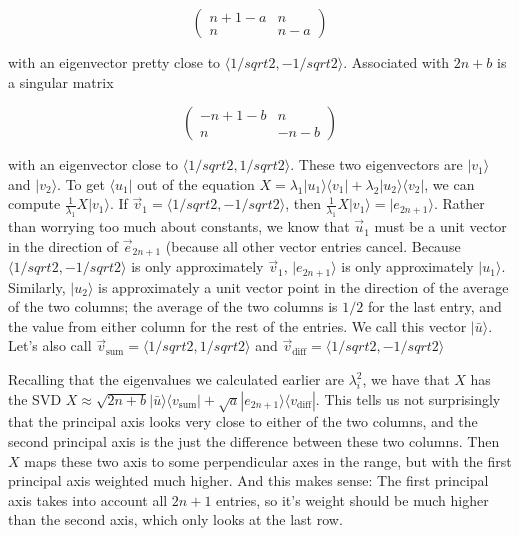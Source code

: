 \documentclass{amsbook}
\begin{document}
\begin{tcolorbox}[title=Example,colback=blue!5]
$$
\left(\begin{array}{cc}n+1-a&n\\n&n-a\end{array}\right)
$$

with an eigenvector pretty close to $\langle1/sqrt2, -1/sqrt2\rangle$.  Associated with $2n+b$ is a singular matrix

$$
\left(\begin{array}{cc}-n+1-b&n\\n&-n-b\end{array}\right)
$$

with an eigenvector close to $\langle1/sqrt2, 1/sqrt2\rangle$.  These two eigenvectors are $|v_1\rangle$ and $|v_2\rangle$.  To get $\langle u_1|$ out of the equation $X=\lambda_1|u_1\rangle\langle v_1|+\lambda_2|u_2\rangle\langle v_2|$, we can compute $\frac{1}{\lambda_1}X|v_1\rangle$.  If $\vec v_1=\langle1/sqrt2, -1/sqrt2\rangle$, then $\frac{1}{\lambda_1}X|v_1\rangle=|e_{2n+1}\rangle$.  Rather than worrying too much about constants, we know that $\vec u_1$ must be a unit vector in the direction of $\vec e_{2n+1}$ (because all other vector entries cancel.  Because $\langle1/sqrt2, -1/sqrt2\rangle$ is only approximately $\vec v_1$, $|e_{2n+1}\rangle$ is only approximately $|u_1\rangle$.  Similarly, $|u_2\rangle$ is approximately a unit vector point in the direction of the average of the two columns; the average of the two columns is $1/2$ for the last entry, and the value from either column for the rest of the entries.  We call this vector $|\bar u\rangle$.  Let's also call $\vec v_{\text{sum}}=\langle1/sqrt2, 1/sqrt2\rangle$ and $\vec v_{\text{diff}}=\langle1/sqrt2, -1/sqrt2\rangle$

Recalling that the eigenvalues we calculated earlier are $\lambda_i^2$, we have that $X$ has the SVD $X\approx\sqrt{2n+b}|\bar u\rangle\langle v_{\text{sum}}|+\sqrt{a}|e_{2n+1}\rangle\langle v_{\text{diff}}|$.  This tells us not surprisingly that the principal axis looks very close to either of the two columns, and the second principal axis is the just the difference between these two columns.  Then $X$ maps these two axis to some perpendicular axes in the range, but with the first principal axis weighted much higher.  And this makes sense:  The first principal axis takes into account all $2n+1$ entries, so it's weight should be much higher than the second axis, which only looks at the last row.


\end{tcolorbox}
\end{document}
